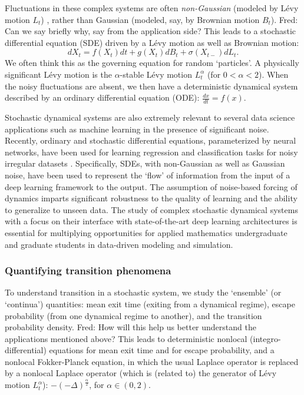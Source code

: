 \documentclass[11pt]{NSFamsart}
\newcommand{\FredNote}[1]{{\color{blue} Fred: #1}}
\begin{document}
Fluctuations in these complex systems are often \emph{non-Gaussian} (modeled by L\'evy motion $L_t$) \cite{Woy,Dit, Shlesinger,taqqu,dybiec2009levy}, rather than Gaussian (modeled, say, by Brownian motion $B_t$). \FredNote{Can we say briefly why, say from the application side?} This leads to a
 stochastic   differential equation (SDE)  \cite{Arnold,   Oksendal, DuanBook2015, Applebaum}
 driven by a L\'evy motion as well as Brownian motion:
 $$
 dX_t= f(X_t) dt + g(X_t) dB_t + \sigma(X_{t-}) dL_t.
 $$
 We often think this as the governing equation for random `particles'. A physically significant L\'evy motion is the  $\alpha$-stable L\'evy motion $L_t^\alpha$ (for $0<\alpha<2$).  
 When the noisy fluctuations are absent, we then have a   deterministic  dynamical system described by an ordinary differential equation (ODE): $ \frac{dx}{dt}=f(x).$
 
 
Stochastic dynamical systems are also extremely relevant to several data science applications such as machine learning in the presence of significant noise. Recently, ordinary and stochastic differential equations, parameterized by neural networks, have been used for learning regression and classification tasks for noisy irregular datasets \cite{chen2018neural,rubanova2019latent,jia2019neural,tzen2019neural,look2020deterministic,liu2019neural}. Specifically, SDEs, with non-Gaussian as well as Gaussian noise, have been used to represent the `flow' of information from the input of a deep learning framework to the output. The assumption of noise-based forcing of dynamics imparts significant robustness to the quality of learning and the ability to generalize to unseen data. The study of complex stochastic dynamical systems with a focus on their interface with state-of-the-art deep learning architectures is essential for multiplying opportunities for applied mathematics undergraduate and graduate students in data-driven modeling and simulation. 


\subsubsection*{Quantifying transition phenomena}
To understand transition   in    a stochastic system, we  study the     `ensemble' (or `continua') quantities: mean exit time (exiting from a dynamical regime),   escape probability (from one dynamical regime to another), and  the transition  probability density. \FredNote{How will this help us better understand the applications mentioned above?}
This leads to deterministic  nonlocal (integro-differential) equations for mean exit time and for escape probability, and a nonlocal Fokker-Planck equation,
in which the usual Laplace operator is replaced
by a nonlocal Laplace operator (which is (related to) the generator of L\'evy motion $L_t^\alpha$):  $-(-\Delta)^{\frac{\alpha}2  }$, for $\alpha \in (0, 2)$.
 
\end{document}
